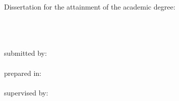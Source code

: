 
\null
\vspace{2\baselineskip}
\noindent
Dissertation for the attainment of the academic degree: \\
\tDegree \\
\vspace{\baselineskip}
\noindent \\
\tTitle \\
\vspace{\baselineskip}

\noindent
submitted by: \\
\tAuthor \\

\noindent
prepared in: \\
\tDepartment \\

\noindent
supervised by: \\
\tSupervisor \\

\noindent
\tSubmissionMonth{}~\tSubmissionYear \\
\vspace{5\baselineskip}
